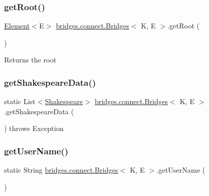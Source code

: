 \hypertarget{classbridges_1_1connect_1_1_bridges_ad46be93cba155fa93fd9082d9d813466}{}\label{classbridges_1_1connect_1_1_bridges_ad46be93cba155fa93fd9082d9d813466} 
\subsubsection{\texorpdfstring{get\+Root()}{getRoot()}}
{\footnotesize\ttfamily \hyperlink{classbridges_1_1base_1_1_element}{Element}$<$E$>$ \hyperlink{classbridges_1_1connect_1_1_bridges}{bridges.\+connect.\+Bridges}$<$ K, E $>$.get\+Root (\begin{DoxyParamCaption}{ }\end{DoxyParamCaption})}

\begin{DoxyReturn}{Returns}
the root 
\end{DoxyReturn}
\hypertarget{classbridges_1_1connect_1_1_bridges_a03ba87a09742cfb40f357253239006e6}{}\label{classbridges_1_1connect_1_1_bridges_a03ba87a09742cfb40f357253239006e6} 
\subsubsection{\texorpdfstring{get\+Shakespeare\+Data()}{getShakespeareData()}}
{\footnotesize\ttfamily static List$<$\hyperlink{classbridges_1_1data__src__dependent_1_1_shakespeare}{Shakespeare}$>$ \hyperlink{classbridges_1_1connect_1_1_bridges}{bridges.\+connect.\+Bridges}$<$ K, E $>$.get\+Shakespeare\+Data (\begin{DoxyParamCaption}{ }\end{DoxyParamCaption}) throws Exception\hspace{0.3cm}{\ttfamily [static]}}

\hypertarget{classbridges_1_1connect_1_1_bridges_a5ff3fdd97d4c71c9c2141c3355e417aa}{}\label{classbridges_1_1connect_1_1_bridges_a5ff3fdd97d4c71c9c2141c3355e417aa} 
\subsubsection{\texorpdfstring{get\+User\+Name()}{getUserName()}}
{\footnotesize\ttfamily static String \hyperlink{classbridges_1_1connect_1_1_bridges}{bridges.\+connect.\+Bridges}$<$ K, E $>$.get\+User\+Name (\begin{DoxyParamCaption}{ }\end{DoxyParamCaption})\hspace{0.3cm}{\ttfamily [static]}}

